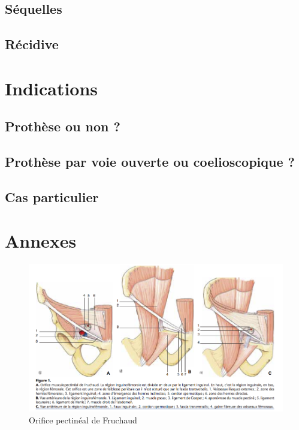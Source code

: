 \documentclass[frenc,10pt,a4paper]{article}
\begin{document}
{\label{247744}}

\subsection{Séquelles}

{\label{324461}}

\subsection{Récidive}

{\label{631665}}

\section{Indications}

{\label{989639}}\par\null

\subsection{Prothèse ou non ?}

{\label{394771}}

\subsection{Prothèse par voie ouverte ou coelioscopique
?}

{\label{515909}}

\subsection{Cas particulier}

{\label{788793}}\par\null

\pagebreak

\section{Annexes}

\begin{figure}[b!]
\begin{center}
\includegraphics[width=0.70\columnwidth]{figures/Orifice_Pectineal_Fruchaud.png}
\caption{{Orifice pectinéal de Fruchaud
{\label{Orifice_Pectineal}}%
}}
\end{center}
\end{figure}
\end{document}

